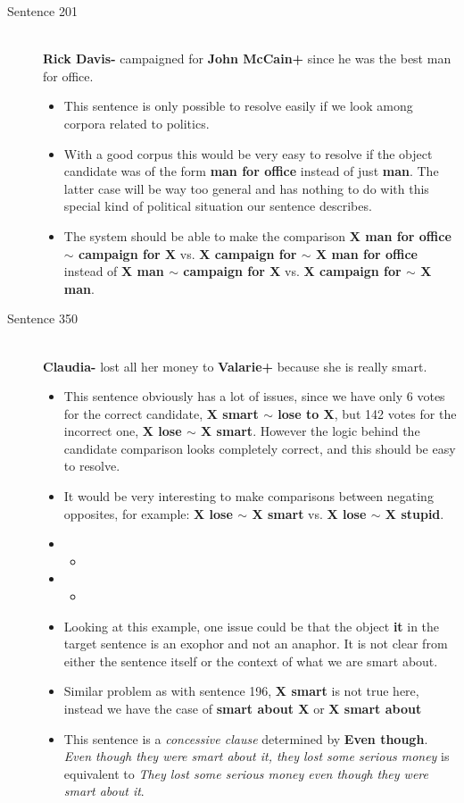 \documentclass{article}
\newcommand{\insertcode}[2]{\begin{itemize}\item[]\end{itemize}} %
\begin{document}
\begin{description}
  \item[Sentence 201] \hfill \\
  {\bf Rick Davis-} campaigned for {\bf John McCain+} since he was the best man for office.
  \begin{itemize}
  	\item This sentence is only possible to resolve easily if we look among corpora related to politics.
  	\item With a good corpus this would be very easy to resolve if the object candidate was of the form {\bf man for office} instead of just {\bf man}. The latter case will be way too general and has nothing to do with this special kind of political situation our sentence describes.
  	\item The system should be able to make the comparison {\bf X man for office $\sim$ campaign for X} vs. {\bf X campaign for $\sim$ X man for office} instead of {\bf X man $\sim$ campaign for X} vs. {\bf X campaign for $\sim$ X man}. 
  \end{itemize}

  \item[Sentence 350] \hfill \\
  {\bf Claudia-} lost all her money to {\bf Valarie+} because she is really smart.
  \begin{itemize}
  	\item This sentence obviously has a lot of issues, since we have only 6 votes for the correct candidate, {\bf X smart $\sim$ lose to X}, but 142 votes for the incorrect one, {\bf X lose $\sim$ X smart}. However the logic behind the candidate comparison looks completely correct, and this should be easy to resolve.
  	\item It would be very interesting to make comparisons between negating opposites, for example: {\bf X lose $\sim$ X smart} vs. {\bf X lose $\sim$ X stupid}.
  	\item \insertcode{"Scripts/350/350-1.sentence"}{Context from $R_1$ and $R_2$.}
  	\item \insertcode{"Scripts/350/350-2.sentence"}{Target sentence for $R_1$ and $R_2$.}
  	\item Looking at this example, one issue could be that the object {\bf it} in the target sentence is an exophor and not an anaphor. It is not clear from either the sentence itself or the context of what we are smart about. 
  	\item Similar problem as with sentence 196, {\bf X smart} is not true here, instead we have the case of {\bf smart about X} or {\bf X smart about}
  	\item This sentence is a {\it concessive clause} determined by {\bf Even though}. {\it Even though they were smart about it, they lost some serious money} is equivalent to {\it They lost some serious money even though they were smart about it}.
  \end{itemize}


\end{description}
\end{document}
